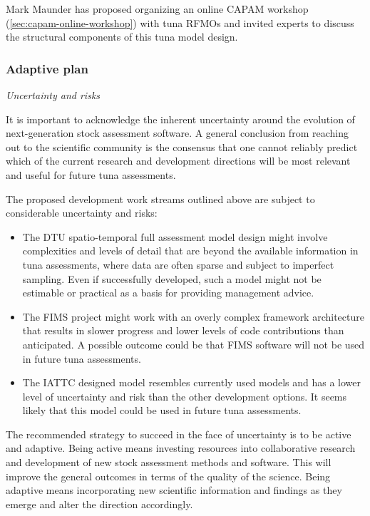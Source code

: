 \documentclass{SCreport}
\begin{document}
Mark Maunder has proposed organizing an online CAPAM workshop
(\autoref{sec:capam-online-workshop}) with tuna RFMOs and invited experts to
discuss the structural components of this tuna model design.

\newpage

\subsubsection{Adaptive plan}

\textit{Uncertainty and risks}

It is important to acknowledge the inherent uncertainty around the evolution of
next-generation stock assessment software. A general conclusion from reaching
out to the scientific community is the consensus that one cannot reliably
predict which of the current research and development directions will be most
relevant and useful for future tuna assessments.

The proposed development work streams outlined above are subject to considerable
uncertainty and risks:

\begin{itemize}
  \item The DTU spatio-temporal full assessment model design might involve
  complexities and levels of detail that are beyond the available information in
  tuna assessments, where data are often sparse and subject to imperfect
  sampling. Even if successfully developed, such a model might not be estimable
  or practical as a basis for providing management advice.
  \item The FIMS project might work with an overly complex framework
  architecture that results in slower progress and lower levels of code
  contributions than anticipated. A possible outcome could be that FIMS software
  will not be used in future tuna assessments.
  \item The IATTC designed model resembles currently used models and has a lower
  level of uncertainty and risk than the other development options. It seems
  likely that this model could be used in future tuna assessments.
\end{itemize}

\vspace{1ex}

The recommended strategy to succeed in the face of uncertainty is to be active
and adaptive. Being active means investing resources into collaborative research
and development of new stock assessment methods and software. This will improve
the general outcomes in terms of the quality of the science. Being adaptive
means incorporating new scientific information and findings as they emerge and
alter the direction accordingly.
\end{document}
